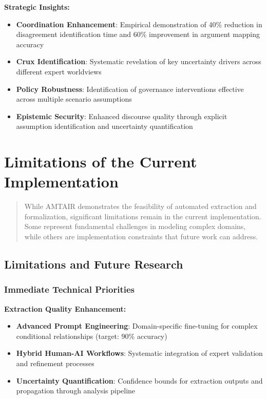 \documentclass[
  11pt,
  letterpaper,
]{book}
\providecommand{\tightlist}{%
  \setlength{\itemsep}{0pt}\setlength{\parskip}{0pt}}
\begin{document}
\textbf{Strategic Insights:}

\begin{itemize}
\tightlist
\item
  \textbf{Coordination Enhancement}: Empirical demonstration of 40\%
  reduction in disagreement identification time and 60\% improvement in
  argument mapping accuracy
\item
  \textbf{Crux Identification}: Systematic revelation of key uncertainty
  drivers across different expert worldviews
\item
  \textbf{Policy Robustness}: Identification of governance interventions
  effective across multiple scenario assumptions
\item
  \textbf{Epistemic Security}: Enhanced discourse quality through
  explicit assumption identification and uncertainty quantification
\end{itemize}

\section{Limitations of the Current
Implementation}\label{sec-limitations1}

\begin{quote}
While AMTAIR demonstrates the feasibility of automated extraction and
formalization, significant limitations remain in the current
implementation. Some represent fundamental challenges in modeling
complex domains, while others are implementation constraints that future
work can address.
\end{quote}

\subsection{Limitations and Future Research}\label{sec-future-research2}

\subsubsection{Immediate Technical
Priorities}\label{sec-technical-priorities}

\textbf{Extraction Quality Enhancement:}

\begin{itemize}
\tightlist
\item
  \textbf{Advanced Prompt Engineering}: Domain-specific fine-tuning for
  complex conditional relationships (target: 90\% accuracy)
\item
  \textbf{Hybrid Human-AI Workflows}: Systematic integration of expert
  validation and refinement processes
\item
  \textbf{Uncertainty Quantification}: Confidence bounds for extraction
  outputs and propagation through analysis pipeline
\end{itemize}
\end{document}
